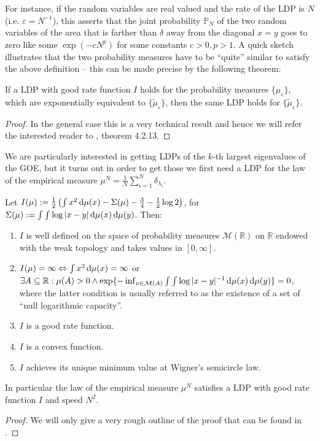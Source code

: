 For instance, if the random variables are real valued and the rate of the LDP is $N$ (i.e. $\varepsilon = N^{-1}$), this asserts that the joint probability $\mathbb P_N$ of the two random variables of the area that is farther than $\delta$ away from the diagonal $x=y$ goes to zero like some $\exp(-cN^p)$ for some constants $c>0, p>1$. A quick sketch illustrates that the two probability measures have to be ``quite'' similar to satisfy the above definition -- this can be made precise by the following theorem:

\begin{theorem}
	If a LDP with good rate function $I$ holds for the probability measures $\{\mu_\varepsilon\}$, which are exponentially equivalent to $\{\tilde\mu_\varepsilon\}$, then the same LDP holds for $\{\tilde\mu_\varepsilon\}$.
\end{theorem}
\begin{proof}
	In the general case this is a very technical result and hence we will refer the interested reader to \cite{Dembo2009LargeDeviations}, theorem 4.2.13.
\end{proof}

We are particularly interested in getting LDPs of the $k$-th largest eigenvalues of the GOE, but it turns out in order to get those we first need a LDP for the law of the empirical measure $\mu^N=\frac{1}{N}\sum_{i=1}^N\delta_{\lambda_i}$.

\begin{theorem}\label{thm:LDPforWSCL}
	Let $I(\mu):=\frac{1}{2}\left(\int x^2\mathop{}\!\mathrm{d}\mu(x) - \Sigma(\mu) - \frac{3}{4}-\frac{1}{2}\log 2 \right)$, for $\Sigma(\mu):=\int\int\log|x-y|\mathop{}\!\mathrm{d}\mu(x)\mathop{}\!\mathrm{d}\mu(y)$. Then:
	\begin{enumerate}
		\item $I$ is well defined on the space of probability measures $\mathcal M(\mathbb{R})$ on $\mathbb{R}$ endowed with the weak topology and takes values in $[0,\infty]$.
		\item $I(\mu)=\infty \Leftrightarrow \int x^2\mathop{}\!\mathrm{d}\mu(x)=\infty$ or $\exists A\subseteq\mathbb R: \mu(A)>0 \land \exp\{-\inf_{\nu\in\mathcal M(A)}\int\int \log|x-y|^{-1}\mathop{}\!\mathrm{d}\mu(x)\mathop{}\!\mathrm{d}\mu(y)\}=0$, where the latter condition is usually referred to as the existence of a set of ``null logarithmic capacity''.
		\item $I$ is a good rate function.
		\item $I$ is a convex function.
		\item $I$ achieves its unique minimum value at Wigner's semicircle law.
	\end{enumerate}
	In particular the law of the empirical measure $\mu^N$ satisfies a LDP with good rate function $I$ and speed $N^2$.
\end{theorem}
\begin{proof}
	We will only give a very rough outline of the proof that can be found in \cite{ArousLDPforWSL}. 
	
\end{proof}

